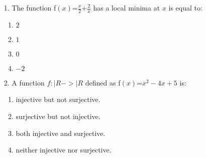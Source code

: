 \documentclass[12pt,-letter paper]{article}
\providecommand{\brak}[1]{\ensuremath{\left(#1\right)}}
\begin{document}
\begin{enumerate}
        \item
                [1.]The function f$\brak{x}$=$\frac{x}{2}$+$\frac{2}{x}$
has a local minima at $x$ is equal to:

                \begin{enumerate}[label={$\brak{\Alph*}$}]
                        \item$2$
                        \item$1$
                        \item$0$
                        \item$-2$
                \end{enumerate}
        \item
                [2.]A function $f:|R->|R $ defined as f$\brak{x}$=$x^2-4
x+5$ is:
                \begin{enumerate}[label={$\brak{\Alph*}$}]
                        \item injective but not surjective.
                        \item surjective but not injective.
                        \item both injective and surjective.
                        \item neither injective nor surjective.
                                \end{enumerate}                                                                                                 
\end{enumerate}
\end{document}
